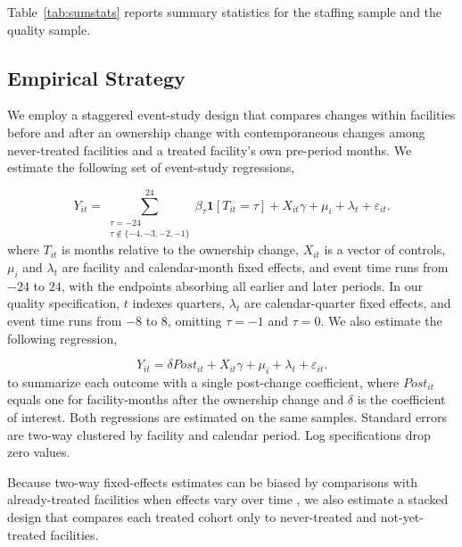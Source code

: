 \documentclass[12pt]{article}
\begin{document}
Table~\ref{tab:sumstats} reports summary statistics for the staffing sample and the quality sample.


\FloatBarrier

\subsection{Empirical Strategy}

We employ a staggered event-study design that compares changes within facilities before and after an ownership change with contemporaneous changes among never-treated facilities and a treated facility's own pre-period months. We estimate the following set of event-study regressions,

\begin{equation}
\label{eq:event-study}
Y_{it}
=
\sum_{\substack{\tau=-24\\ \tau\notin\{-4,-3,-2,-1\}}}^{24}
\beta_{\tau}\mathbf{1}[T_{it}=\tau]
+
X_{it}\gamma
+
\mu_i
+
\lambda_t
+
\varepsilon_{it}.
\end{equation}
where \(T_{it}\) is months relative to the ownership change, \(X_{it}\) is a vector of controls, \(\mu_i\) and \(\lambda_t\) are facility and calendar-month fixed effects, and event time runs from \(-24\) to \(24\), with the endpoints absorbing all earlier and later periods. In our quality specification, \(t\) indexes quarters, \(\lambda_t\) are calendar-quarter fixed effects, and event time runs from \(-8\) to \(8\), omitting \(\tau=-1\) and \(\tau=0\). We also estimate the following regression,

\begin{equation}
\label{eq:twfe-post}
Y_{it}
=
\delta \textit{Post}_{it}
+
X_{it}\gamma
+
\mu_i
+
\lambda_t
+
\varepsilon_{it}.
\end{equation}
to summarize each outcome with a single post-change coefficient, where \(\textit{Post}_{it}\) equals one for facility-months after the ownership change and \(\delta\) is the coefficient of interest. Both regressions are estimated on the same samples. Standard errors are two-way clustered by facility and calendar period. Log specifications drop zero values.

Because two-way fixed-effects estimates can be biased by comparisons with already-treated facilities when effects vary over time \citep{goodman_bacon_2021}, we also estimate a stacked design that compares each treated cohort only to never-treated and not-yet-treated facilities.
\end{document}
